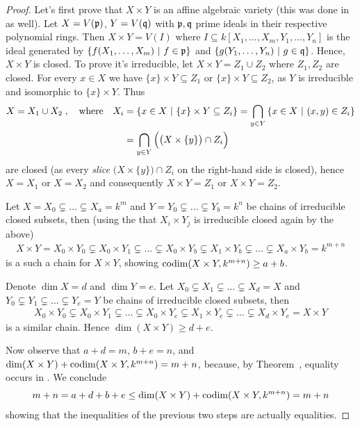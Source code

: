 \documentclass[a4paper,parskip=half,numbers=enddot, DIV=12]{scrreprt}
\begin{document}
\begin{proof}
	Let's first prove that $X\times Y$ is an affine algebraic variety (this was done in \cite[proof of Proposition~2.2.6]{alg1} as well). Let $X=V(\mathfrak{p})$, $Y=V(\mathfrak{q})$ with $\mathfrak{p},\mathfrak{q}$ prime ideals in their respective polynomial rings. Then $X\times Y=V(I)$ where $I\subseteq k[X_1,\ldots,X_m,Y_1,\ldots,Y_n]$ is  the ideal generated by $\left\{f(X_1,\ldots,X_m)\ \middle|\  f\in\mathfrak{p}\right\}$ and $\left\{g(Y_1,\ldots,Y_n)\ \middle|\  g\in\mathfrak{q}\right\}$. Hence, $X\times Y$ is closed.
    To prove it's irreducible, let $X\times Y = Z_1\cup Z_2$ where $Z_1,Z_2$ are closed. For every $x\in X$ we have $\{x\}\times Y\subseteq Z_1$ or $\{x\}\times Y\subseteq Z_2$, as $Y$ is irreducible and isomorphic to $\{x\}\times Y$. Thus 
    \begin{align*}
    	X= X_1\cup X_2\;,\quad\text{where}\quad X_i&=\left\{x\in X\ \middle|\  \{x\}\times Y\subseteq Z_i\right\} = \bigcap_{y\in Y}\left\{x\in X\ \middle|\  (x,y)\in Z_i\right\}\\
    	&=\bigcap_{y\in Y} \Big(\big(X\times\{y\}\big)\cap Z_i\Big)
    \end{align*}
    are closed (as every \emph{slice} $\big(X\times\{y\}\big)\cap Z_i$ on the right-hand side is closed), hence $X=X_1$ or $X=X_2$ and consequently $X\times Y = Z_1$ or $X\times Y=Z_2$.
    
	Let $X= X_0\subsetneq \ldots\subsetneq X_a=k^m$ and $Y= Y_0\subsetneq \ldots\subsetneq Y_b=k^n$ be chains of irreducible closed subsets, then (using the that $X_i\times Y_j$ is irreducible closed again by the above)
    \begin{align*}
        X\times Y = X_0\times Y_0 \subsetneq X_0\times Y_1\subsetneq\ldots\subsetneq X_0\times Y_b\subsetneq X_1\times Y_b\subsetneq \ldots\subsetneq X_a\times Y_b = k^{m+n}
    \end{align*}
    is a such a chain for $X\times Y$, showing $\operatorname{codim}(X\times Y,k^{m+n})\geq a+b$.
    
	Denote $\dim X=d$ and $\dim Y=e$. Let $X_0\subsetneq X_1\subsetneq \ldots\subsetneq X_d=X$ and $Y_0\subsetneq Y_1\subsetneq \ldots\subsetneq Y_e=Y$ be chains of irreducible closed subsets, then 
    \begin{align*}
        X_0\times Y_0 \subsetneq X_0\times Y_1\subsetneq\ldots\subsetneq X_0\times Y_e\subsetneq X_1\times Y_e\subsetneq \ldots\subsetneq X_d\times Y_e =X \times Y
    \end{align*}
    is a similar chain. Hence $\dim(X\times Y)\geq d+e$.
    
    Now observe that $a+d=m$, $b+e=n$, and $\dim(X\times Y)+\operatorname{codim}(X\times Y,k^{m+n}) = m+n$, because, by Theorem~, equality occurs in . We conclude
    \begin{align*}
        m+n = a+d+b+e \leq \dim(X\times Y) +\operatorname{codim}(X\times Y,k^{m+n}) = m+n
    \end{align*}
    showing that the inequalities of the previous two steps are actually equalities.
\end{proof}
\end{document}
